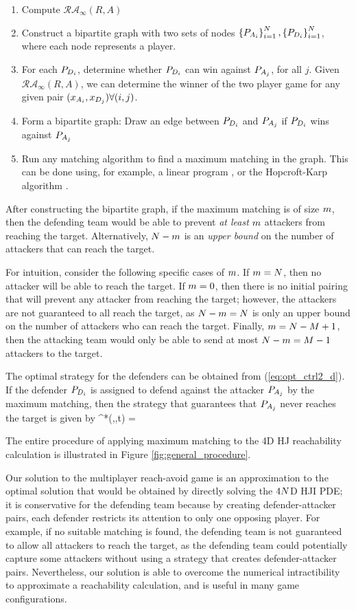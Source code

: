 \begin{enumerate}
\item Compute $\mathcal{RA}_\infty(R,A)$
\item Construct a bipartite graph with two sets of nodes $\left\{P_{A_{i}}\right\}_{i=1}^N,\left\{P_{D_{i}}\right\}_{i=1}^N$, where each node represents a player.
\item For each $P_{D_{i}}$, determine whether $P_{D_{i}}$ can win against $P_{A_{j}}$, for all $j$. Given $\mathcal{RA}_\infty(R,A)$, we can determine the winner of the two player game for any given pair $(x_{A_{i}},x_{D_{j}}) \forall (i,j)$.
\item Form a bipartite graph: Draw an edge between $P_{D_{i}}$ and $P_{A_{j}}$ if $P_{D_{i}}$ wins against $P_{A_{j}}$
\item Run any matching algorithm to find a maximum matching in the graph. This can be done using, for example, a linear program \cite{Schrjiver2004}, or the Hopcroft-Karp algorithm \cite{Karpinski1998}.
\end{enumerate}

After constructing the bipartite graph, if the maximum matching is of size $m$, then the defending team would be able to prevent \textit{at least} $m$ attackers from reaching the target. Alternatively, $N-m$ is an \textit{upper bound} on the number of attackers that can reach the target.

For intuition, consider the following specific cases of $m$. If $m=N$, then no attacker will be able to reach the target. If $m=0$, then there is no initial pairing that will prevent any attacker from reaching the target; however, the attackers are not guaranteed to all reach the target, as $N-m=N$ is only an upper bound on the number of attackers who can reach the target. Finally, $m=N-M+1$, then the attacking team would only be able to send at most $N-m=M-1$ attackers to the target. 

The optimal strategy for the defenders can be obtained from (\ref{eq:opt_ctrl2_d}). If the \ith defender $P_{D_{i}}$ is assigned to defend against the \jth attacker $P_{A_{j}}$ by the maximum matching, then the strategy that guarantees that $P_{A_{j}}$ never reaches the target is given by 
\bq \label{eq:opt_ctrl3_d}
^*(,,t) = \velb {}
\eq

The entire procedure of applying maximum matching to the 4D HJ reachability calculation is illustrated in Figure \ref{fig:general_procedure}.

Our solution to the multiplayer reach-avoid game is an approximation to the optimal solution that would be obtained by directly solving the $4N$D HJI PDE; it is conservative for the defending team because by creating defender-attacker pairs, each defender restricts its attention to only one opposing player. For example, if no suitable matching is found, the defending team is not guaranteed to allow all attackers to reach the target, as the defending team could potentially capture some attackers without using a strategy that creates defender-attacker pairs. Nevertheless, our solution is able to overcome the numerical intractibility to approximate a reachability calculation, and is useful in many game configurations.

